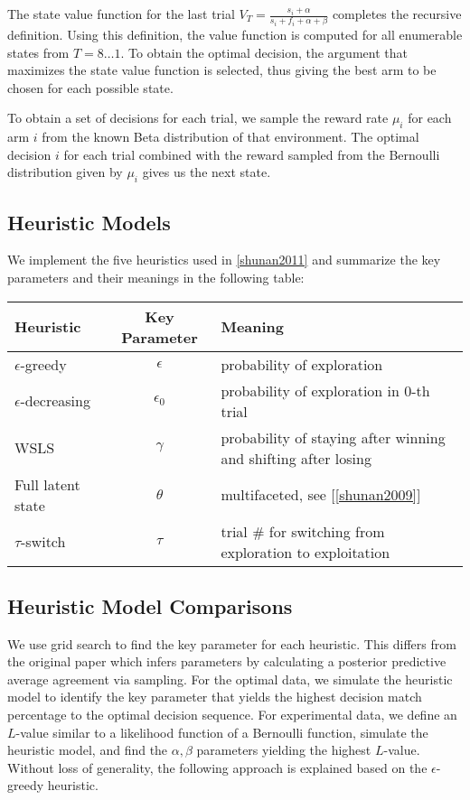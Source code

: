 The state value function for the last trial $V_T=\frac{s_i + \alpha}{s_i + f_i + \alpha + \beta}$ completes the recursive definition. Using this definition, the value function is computed for all enumerable states from $T=8\ldots1$. To obtain the optimal decision, the argument that maximizes the state value function is selected, thus giving the best arm to be chosen for each possible state. 

To obtain a set of decisions for each trial, we sample the reward rate $\mu_i$ for each arm $i$ from the known Beta distribution of that environment. The optimal decision $i$ for each trial combined with the reward sampled from the Bernoulli distribution given by $\mu_i$ gives us the next state.

\subsection{Heuristic Models}
We implement the five heuristics used in \ref{shunan2011} and summarize the key parameters and their meanings in the following table: 

\begin{table}[h]
\begin{tabular}{|l|c|l|}
\hline
\textbf{Heuristic} & \textbf{Key Parameter} & \textbf{Meaning} \\ \hline
$\epsilon$-greedy & $\epsilon$ & probability of exploration \\ \hline
$\epsilon$-decreasing & $\epsilon_0$ & probability of exploration in 0-th trial \\ \hline
WSLS & $\gamma$ & probability of staying after winning and shifting after losing \\ \hline
Full latent state & $\theta$ & multifaceted, see [\ref{shunan2009}] \\ \hline
$\tau$-switch & $\tau$ & trial \# for switching from exploration to exploitation \\ \hline
\end{tabular}
\end{table}

\subsection{Heuristic Model Comparisons}
We use grid search to find the key parameter for each heuristic. This differs from the original paper which infers parameters by calculating a posterior predictive average agreement via sampling. For the optimal data, we simulate the heuristic model to identify the key parameter that yields the highest decision match percentage to the optimal decision sequence. For experimental data, we define an $L$-value similar to a likelihood function of a Bernoulli function, simulate the heuristic model, and find the $\alpha,\beta$ parameters yielding the highest $L$-value. Without loss of generality, the following approach is explained based on the $\epsilon$-greedy heuristic. 

